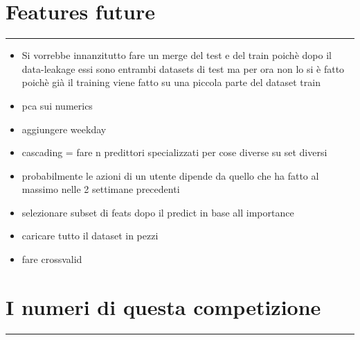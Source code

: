 \documentclass[11pt]{article}
\providecommand{\tightlist}{%
      \setlength{\itemsep}{0pt}\setlength{\parskip}{0pt}}
\begin{document}
    \section{Features future}\label{features-future}

\begin{center}\rule{0.5\linewidth}{\linethickness}\end{center}

\begin{itemize}
\tightlist
\item
  Si vorrebbe innanzitutto fare un merge del test e del train poichè
  dopo il data-leakage essi sono entrambi datasets di test ma per ora
  non lo si è fatto poichè già il training viene fatto su una piccola
  parte del dataset train
\item
  pca sui numerics
\item
  aggiungere weekday
\item
  cascading = fare n predittori specializzati per cose diverse su set
  diversi
\item
  probabilmente le azioni di un utente dipende da quello che ha fatto al
  massimo nelle 2 settimane precedenti
\item
  selezionare subset di feats dopo il predict in base all importance
\item
  caricare tutto il dataset in pezzi
\item
  fare crossvalid
\end{itemize}

    \section{I numeri di questa
competizione}\label{i-numeri-di-questa-competizione}

\begin{center}\rule{0.5\linewidth}{\linethickness}\end{center}
\end{document}
